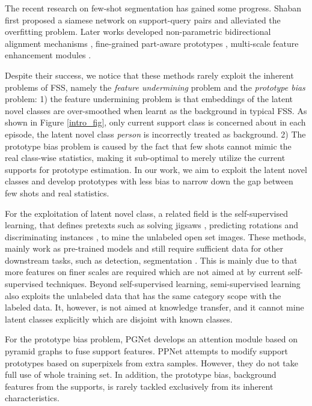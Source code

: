 \documentclass[10pt,twocolumn,letterpaper]{article}
\begin{document}
The recent research on few-shot segmentation \cite{shaban2017one, zhang2018sg, wang2019panet, liu2020part, tian2020prior} has gained some progress. Shaban \etal \cite{shaban2017one} first proposed a siamese network on support-query pairs and alleviated the overfitting problem. Later works developed non-parametric bidirectional alignment mechanisms \cite{wang2019panet}, fine-grained part-aware prototypes \cite{liu2020part}, multi-scale feature enhancement modules \cite{tian2020prior} \etc. 

Despite their success, we notice that these methods rarely exploit the inherent problems of FSS, namely the \textit{feature undermining} problem and the \textit{prototype bias} problem: 1) the feature undermining problem is that embeddings of the latent novel classes are over-smoothed when learnt as the background in typical FSS. As shown in Figure \ref{intro_fig}, only current support class is concerned about in each episode, the latent novel class \textsl{person} is incorrectly treated as background. 2) The prototype bias problem is caused by the fact that few shots cannot mimic the real class-wise statistics, making it sub-optimal to merely utilize the current supports for prototype estimation. In our work, we aim to exploit the latent novel classes and develop prototypes with less bias to narrow down the gap between few shots and real statistics. 

For the exploitation of latent novel class, a related field is the self-supervised learning, that defines pretexts such as solving jigsaws \cite{noroozi2016unsupervised}, predicting rotations \cite{gidaris2018unsupervised} and discriminating instances \cite{he2020momentum, chen2020simple}, to mine the unlabeled open set images. These methods, mainly work as pre-trained models and still require sufficient data for other downstream tasks, such as detection, segmentation \etc. This is mainly due to that more features on finer scales are required which are not aimed at by current self-supervised techniques. Beyond self-supervised learning, semi-supervised learning also exploits the unlabeled data that has the same category scope with the labeled data. It, however, is not aimed at knowledge transfer, and it cannot mine latent classes explicitly which are disjoint with known classes.

For the prototype bias problem, PGNet \cite{zhang2019pyramid} develops an attention module based on pyramid graphs to fuse support features. PPNet \cite{liu2020part} attempts to modify support prototypes based on superpixels from extra samples. However, they do not take full use of whole training set. In addition, the prototype bias, \ie background features from the supports, is rarely tackled exclusively from its inherent characteristics.
\end{document}
